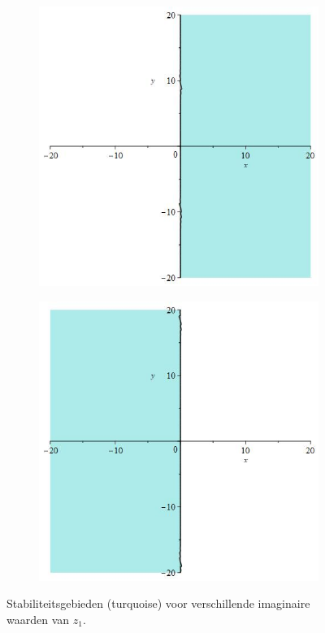 \documentclass[12pt]{article}
\begin{document}
\begin{figure}[H]
\begin{subfigure}{0.24\textwidth}
    \end{subfigure}
    \begin{subfigure}{0.24\textwidth}
        \includegraphics[width=0.9\linewidth]{stabrks3_115i.jpg}
    \end{subfigure}
    \begin{subfigure}{0.24\textwidth}
        \includegraphics[width=0.9\linewidth]{stabrks3_13i.jpg}
    \end{subfigure}
    \caption{Stabiliteitsgebieden (turquoise) voor verschillende imaginaire waarden van \(z_1\).}
    \label{fig:stabrks3imag}
\end{figure}
\end{document}
